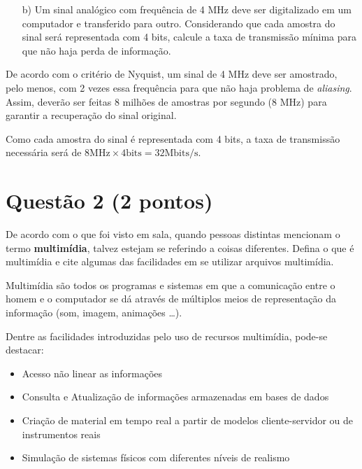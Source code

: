 \documentclass[a4paper,11pt]{article}
\begin{document}
\begin{itemize}
\item[b)] Um sinal analógico com frequência de 4 MHz deve ser digitalizado em um
computador e transferido para outro. Considerando que cada amostra do sinal será
representada com 4 bits, calcule a taxa de transmissão mínima para que não haja
perda de informação.
\end{itemize}

De acordo com o critério de Nyquist, um sinal de 4 MHz deve ser amostrado, pelo
menos, com 2 vezes essa frequência para que não haja problema de {\it aliasing}.
Assim, deverão ser feitas 8 milhões de amostras por segundo (8 MHz) para
garantir a recuperação do sinal original. 

Como cada amostra do sinal é representada com 4 bits, a taxa de transmissão
necessária será de $8 \text{MHz} \times 4 \text{bits} = 32 \text{Mbits/s}$.

\pagebreak

\section*{Questão 2 (2 pontos)}
De acordo com o que foi visto em sala, quando pessoas distintas mencionam o
termo {\bf multimídia}, talvez estejam se referindo a coisas diferentes.
Defina o que é multimídia e cite algumas das facilidades em se utilizar arquivos
multimídia.

\vspace{0.25cm}

Multimídia são todos os programas e sistemas em que a comunicação entre o homem
e o computador se dá através de múltiplos meios de representação da informação
(som, imagem, animações \ldots).

Dentre as facilidades introduzidas pelo uso de recursos multimídia, pode-se
destacar:

\begin{itemize}
    \item Acesso não linear as informações
    \item Consulta e Atualização de informações armazenadas em bases de dados
    \item Criação de material em tempo real a partir de modelos cliente-servidor
ou de instrumentos reais
    \item Simulação de sistemas físicos com diferentes níveis de realismo
\end{itemize}

\pagebreak
\end{document}
